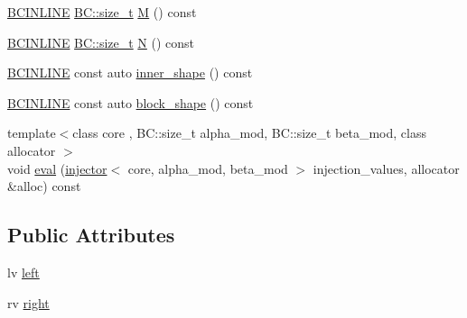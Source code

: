 \begin{DoxyCompactItemize}
\item 
\hyperlink{BlackCat__Common_8h_a6699e8b0449da5c0fafb878e59c1d4b1}{B\+C\+I\+N\+L\+I\+NE} \hyperlink{namespaceBC_a6007cbc4eeec401a037b558910a56173}{B\+C\+::size\+\_\+t} \hyperlink{structBC_1_1tensors_1_1exprs_1_1Binary__Expression_3_01oper_1_1gemv_3_01System__Tag_01_4_00_01lv_00_01rv_01_4_a93f5365eff658bd1f1579b845f7a010c}{M} () const 
\item 
\hyperlink{BlackCat__Common_8h_a6699e8b0449da5c0fafb878e59c1d4b1}{B\+C\+I\+N\+L\+I\+NE} \hyperlink{namespaceBC_a6007cbc4eeec401a037b558910a56173}{B\+C\+::size\+\_\+t} \hyperlink{structBC_1_1tensors_1_1exprs_1_1Binary__Expression_3_01oper_1_1gemv_3_01System__Tag_01_4_00_01lv_00_01rv_01_4_a41c328a098791d9998afd8ed60359187}{N} () const 
\item 
\hyperlink{BlackCat__Common_8h_a6699e8b0449da5c0fafb878e59c1d4b1}{B\+C\+I\+N\+L\+I\+NE} const auto \hyperlink{structBC_1_1tensors_1_1exprs_1_1Binary__Expression_3_01oper_1_1gemv_3_01System__Tag_01_4_00_01lv_00_01rv_01_4_a5a43da4052fbb1cc58296bb3cfd3cd0d}{inner\+\_\+shape} () const 
\item 
\hyperlink{BlackCat__Common_8h_a6699e8b0449da5c0fafb878e59c1d4b1}{B\+C\+I\+N\+L\+I\+NE} const auto \hyperlink{structBC_1_1tensors_1_1exprs_1_1Binary__Expression_3_01oper_1_1gemv_3_01System__Tag_01_4_00_01lv_00_01rv_01_4_af5481c3b47ce0442909b8787d8ea4177}{block\+\_\+shape} () const 
\item 
{\footnotesize template$<$class core , B\+C\+::size\+\_\+t alpha\+\_\+mod, B\+C\+::size\+\_\+t beta\+\_\+mod, class allocator $>$ }\\void \hyperlink{structBC_1_1tensors_1_1exprs_1_1Binary__Expression_3_01oper_1_1gemv_3_01System__Tag_01_4_00_01lv_00_01rv_01_4_a361b4ae1d329f6c69f31e94c56c948d8}{eval} (\hyperlink{structBC_1_1tensors_1_1exprs_1_1injector}{injector}$<$ core, alpha\+\_\+mod, beta\+\_\+mod $>$ injection\+\_\+values, allocator \&alloc) const 
\end{DoxyCompactItemize}
\subsection*{Public Attributes}
\begin{DoxyCompactItemize}
\item 
lv \hyperlink{structBC_1_1tensors_1_1exprs_1_1Binary__Expression_3_01oper_1_1gemv_3_01System__Tag_01_4_00_01lv_00_01rv_01_4_a3addfabe5273dd8a4337b5ed3269cd2a}{left}
\item 
rv \hyperlink{structBC_1_1tensors_1_1exprs_1_1Binary__Expression_3_01oper_1_1gemv_3_01System__Tag_01_4_00_01lv_00_01rv_01_4_ab93781c63065643907eed77eb0cd90c5}{right}
\end{DoxyCompactItemize}
